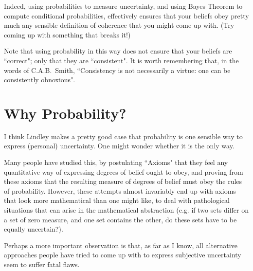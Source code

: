 \documentclass{article}[11pt]
\begin{document}
Indeed, using probabilities to measure uncertainty, and using Bayes Theorem to compute conditional probabilities, effectively ensures that your beliefs obey pretty much any sensible definition of coherence that you might come up with.
(Try coming up with something that breaks it!)

Note that using probability in this way does not ensure that your beliefs are ``correct"; only that they are ``consistent". It is worth remembering that, in the words of C.A.B.~Smith, ``Consistency is not necessarily a virtue: one can be consistently obnoxious".

\section{Why Probability?}

I think Lindley makes a pretty good case that probability is one sensible way to express (personal) uncertainty. One might wonder whether it is the only way.

Many people have studied this, 
by postulating ``Axioms" that they feel any quantitative way of expressing degrees of belief ought to obey, and proving from these axioms that the resulting measure of degrees of belief 
must obey the rules of probability. 
However, these attempts almost invariably end up with axioms that look more mathematical than one might like, to deal with pathological situations that
can arise in the mathematical abstraction (e.g. if two sets differ on a set of zero measure, and one set contains the other, do these sets have to be equally uncertain?).

Perhaps a more important observation is that, as
far as I know, all alternative approaches people have tried to come up with to express subjective uncertainty seem to suffer fatal flaws.
\end{document}
